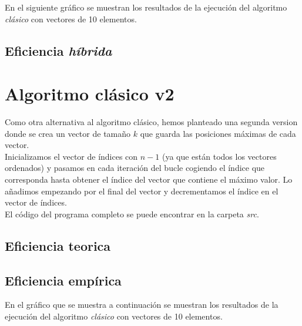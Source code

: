 \documentclass[11pt]{article}
\begin{document}
En el siguiente gráfico se muestran los resultados de la
ejecución del algoritmo \textit{clásico} con vectores de 10 elementos.

\begin{center}
	
\end{center}

\subsection*{Eficiencia \textit{híbrida}}

\section*{Algoritmo clásico v2}
 
 Como otra alternativa al algoritmo clásico, hemos planteado una segunda version donde se crea un vector de tamaño $k$ que guarda las posiciones máximas de cada vector. \\
 
 Inicializamos el vector de índices con $n - 1$ (ya que están todos los vectores ordenados) y pasamos en cada iteración del bucle cogiendo el índice que corresponda hasta obtener el índice del vector que contiene el máximo valor. Lo añadimos empezando por el final del vector y decrementamos el índice en el vector de índices. \\
 
 El código del programa completo se puede encontrar en la carpeta \textit{src}.
 
 
 
 \subsection*{Eficiencia teorica}
 
 \subsection*{Eficiencia empírica}
 
 En el gráfico que se muestra a continuación se muestran los resultados de la
 ejecución del algoritmo \textit{clásico} con vectores de 10 elementos.
 
 \begin{center}
 	
 \end{center}
\end{document}
